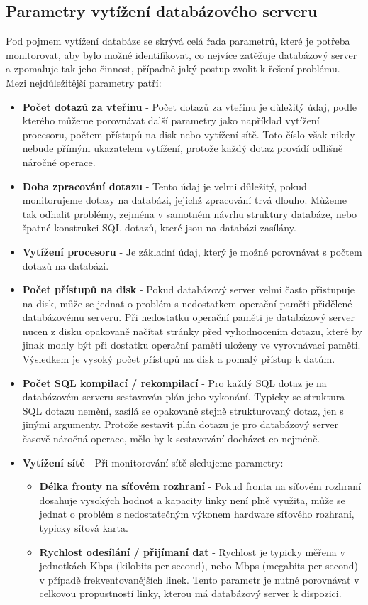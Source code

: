 \documentclass[czech,bachelor,public,dept460,male,cpdeclaration,twoside]{diploma}
\begin{document}
\subsection{Parametry vytížení databázového serveru}
Pod pojmem vytížení databáze se skrývá celá řada parametrů, které je potřeba monitorovat, aby bylo možné identifikovat, co nejvíce zatěžuje databázový server a zpomaluje tak jeho činnost, případně jaký postup zvolit k řešení problému. Mezi nejdůležitější parametry patří:
\begin{itemize}
  \item \textbf{Počet dotazů za vteřinu} - Počet dotazů za vteřinu je důležitý údaj, podle kterého můžeme porovnávat další parametry jako například vytížení procesoru, počtem přístupů na disk nebo vytížení sítě. Toto číslo však nikdy nebude přímým ukazatelem vytížení, protože každý dotaz provádí odlišně náročné operace.
  \item \textbf{Doba zpracování dotazu} - Tento údaj je velmi důležitý, pokud monitorujeme dotazy na databázi, jejichž zpracování trvá dlouho. Můžeme tak odhalit problémy, zejména v samotném návrhu struktury databáze, nebo špatné konstrukci SQL dotazů, které jsou na databázi zasílány.
  \item \textbf{Vytížení procesoru} - Je základní údaj, který je možné porovnávat s počtem dotazů na databázi. 
  \item \textbf{Počet přístupů na disk} - Pokud databázový server velmi často přistupuje na disk, může se jednat o problém s nedostatkem operační paměti přidělené databázovému serveru. Při nedostatku operační paměti je databázový server nucen z disku opakovaně načítat stránky před vyhodnocením dotazu, které by jinak mohly být při dostatku operační paměti uloženy ve vyrovnávací paměti. Výsledkem je vysoký počet přístupů na disk a pomalý přístup k datům.
  \item \textbf{Počet SQL kompilací / rekompilací} - Pro každý SQL dotaz je na databázovém serveru sestavován plán jeho vykonání. Typicky se struktura SQL dotazu nemění, zasílá se opakovaně stejně strukturovaný dotaz, jen s jinými argumenty. Protože sestavit plán dotazu je pro databázový server časově náročná operace, mělo by k sestavování docházet co nejméně. 
  \item \textbf{Vytížení sítě} - Při monitorování sítě sledujeme parametry:
  \begin{itemize}
  	\item \textbf{Délka fronty na síťovém rozhraní} - Pokud fronta na síťovém rozhraní dosahuje vysokých hodnot a kapacity linky není plně využita, může se jednat o problém s nedostatečným výkonem hardware síťového rozhraní, typicky síťová karta.
  	\item \textbf{Rychlost odesílání / přijímaní dat} - Rychlost je typicky měřena v jednotkách Kbps (kilobits per second), nebo Mbps (megabits per second) v případě frekventovanějších linek. Tento parametr je nutné porovnávat v celkovou propustností linky, kterou má databázový server k dispozici. 
  \end{itemize}
\end{itemize}
\end{document}
